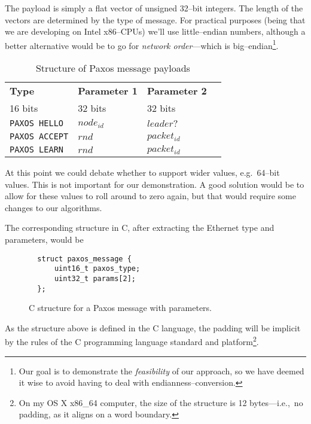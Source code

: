 The payload is simply a flat vector of unsigned 32--bit integers.  The length
of the vectors are determined by the type of message.  For practical
purposes (being that we are developing on Intel x86--CPUs) we'll use
little--endian numbers, although a better alternative would be to go for
\textit{network order}---which is big--endian\footnote{Our goal is to
demonstrate the \textit{feasibility} of our approach, so we have deemed it
wise to avoid having to deal with endianness--conversion.}.

\begin{table}[H]
  \centering
  \begin{tabular}{|l|l|l|l|}
    \hline \textbf{Type} & \textbf{Parameter 1} & \textbf{Parameter 2} \\
           16 bits & 32 bits & 32 bits \\
    \hline \texttt{PAXOS HELLO} & $node_{id}$ & $leader?$ \\
    \hline \texttt{PAXOS ACCEPT} & $rnd$ & $packet_{id}$ \\
    \hline \texttt{PAXOS LEARN} & $rnd$ & $packet_{id}$ \\
    \hline
  \end{tabular}
  \caption{Structure of Paxos message payloads}
  \label{table:paxos.payload.structure}
\end{table}

At this point we
could debate whether to support wider values, e.g.~64--bit values.
This is not important for our demonstration.  A good solution would be to
allow for these values to roll around to zero again, but that would require
some changes to our algorithms.

The corresponding structure in C, after extracting the Ethernet type and
parameters, would be

\begin{figure}[H]
  \begin{Verbatim}
  struct paxos_message {
      uint16_t paxos_type;
      uint32_t params[2];
  };
  \end{Verbatim}
  \caption{C structure for a Paxos message with parameters.}
  \label{struct:paxos.message}
\end{figure}

As the structure above is defined in the C language, the padding will be
implicit by the rules of the C programming language standard and
platform\footnote{On my OS X x86\_{}64 computer, the size of the structure
is 12 bytes---i.e.,~no padding, as it aligns on a word boundary.}.


